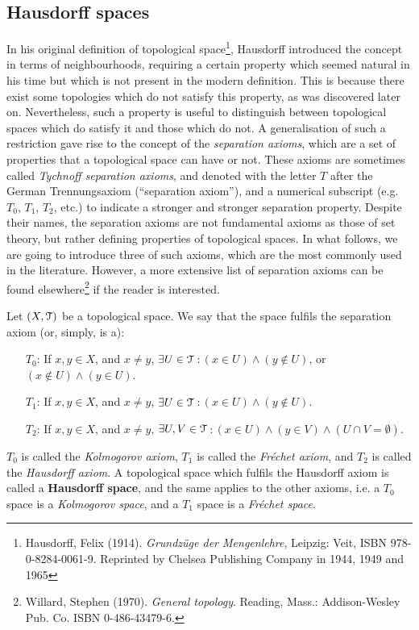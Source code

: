 \subsection{Hausdorff spaces}\label{subsec:hausdorff-spaces}

In his original definition of topological space\footnote{Hausdorff, Felix (1914). \emph{Grundz\"{u}ge der Mengenlehre}, Leipzig: Veit, ISBN 978-0-8284-0061-9. Reprinted by Chelsea Publishing Company in 1944, 1949 and 1965}, Hausdorff introduced the concept in terms of neighbourhoods, requiring a certain property which seemed natural in his time but which is not present in the modern definition.
This is because there exist some topologies which do not satisfy this property, as was discovered later on.
Nevertheless, such a property is useful to distinguish between topological spaces which do satisfy it and those which do not.
A generalisation of such a restriction gave rise to the concept of the \emph{separation axioms}, which are a set of properties that a topological space can have or not.
These axioms are sometimes called \emph{Tychnoff separation axioms}, and denoted with the letter $T$ after the German Trennungsaxiom (``separation axiom''), and a numerical subscript (e.g. $T_0$, $T_1$, $T_2$, etc.) to indicate a stronger and stronger separation property.
Despite their names, the separation axioms are not fundamental axioms as those of set theory, but rather defining properties of topological spaces.
In what follows, we are going to introduce three of such axioms, which are the most commonly used in the literature.
However, a more extensive list of separation axioms can be found elsewhere\footnote{Willard, Stephen (1970). \emph{General topology}. Reading, Mass.: Addison-Wesley Pub. Co. ISBN 0-486-43479-6.} if the reader is interested.

\begin{definition}
	Let $(X, \EuScript{T})$ be a topological space. We say that the space fulfils the separation axiom (or, simply, is a):
	\begin{itemize}
		\item[$T_0$:] If $x,y\in X$, and $x\neq y$, $\exists U\in\EuScript{T}$\,:\,$(x\in U) \land (y\notin U)$, or $(x\notin U) \land (y\in U)$.
		\item[$T_1$:] If $x,y\in X$, and $x\neq y$, $\exists U\in\EuScript{T}$\,:\,$(x\in U)\land (y\notin U)$.
		\item[$T_2$:] If $x,y\in X$, and $x\neq y$, $\exists U,V\in\EuScript{T}$\,:\,$(x\in U)\land (y\in V) \land (U\cap V=\emptyset)$.
	\end{itemize}
	$T_0$ is called the \emph{Kolmogorov axiom}, $T_1$ is called the \emph{Fr\'{e}chet axiom}, and $T_2$ is called the \emph{Hausdorff axiom}.
	A topological space which fulfils the Hausdorff axiom is called a \textbf{Hausdorff space}, and the same applies to the other axioms, i.e. a $T_0$ space is a \emph{Kolmogorov space}, and a $T_1$ space is a \emph{Fr\'{e}chet space}.
\end{definition}

